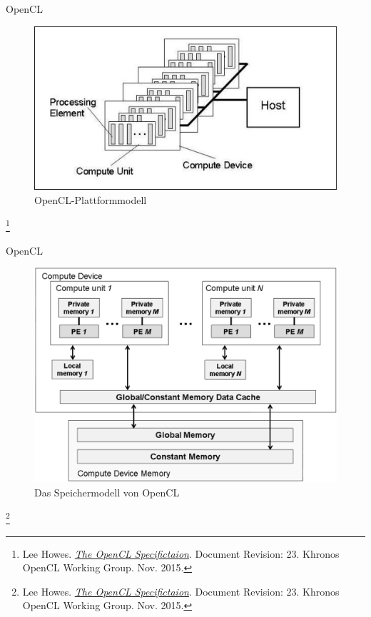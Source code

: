\documentclass[10pt]{beamer}
\let\svthefootnote\thefootnote
\begin{document}
\begin{frame}{OpenCL}
  \begin{figure}
    \centering
    \includegraphics[width=.9\linewidth]{figures/fg-opencl-platform-model.pdf}
    \caption{OpenCL-Plattformmodell}
  \end{figure}

  \footnotesize
  \let\thefootnote\relax\footnote{Lee Howes. \href{https://www.khronos.org/registry/OpenCL/specs/opencl-2.0.pdf}{\textit{The OpenCL Specifictaion}}. Document Revision: 23. Khronos OpenCL Working Group. Nov. 2015.}
  \addtocounter{footnote}{-1}\let\thefootnote\svthefootnote\relax
  \normalsize
\end{frame}

\begin{frame}{OpenCL}
  \begin{figure}
    \centering
    \includegraphics[width=.75\linewidth]{figures/fg-opencl-memory-model.pdf}
    \caption{Das Speichermodell von OpenCL}
  \end{figure}

  \footnotesize
  \let\thefootnote\relax\footnote{Lee Howes. \href{https://www.khronos.org/registry/OpenCL/specs/opencl-2.0.pdf}{\textit{The OpenCL Specifictaion}}. Document Revision: 23. Khronos OpenCL Working Group. Nov. 2015.}
  \addtocounter{footnote}{-1}\let\thefootnote\svthefootnote\relax
  \normalsize
\end{frame}
\end{document}
